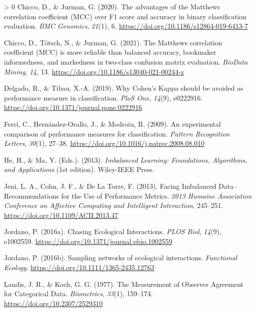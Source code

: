 \documentclass[10pt,oneside]{article}
\newlength{\cslhangindent}
\newenvironment{CSLReferences}[3] %
 {%
  \setlength{\parindent}{0pt}
  \ifodd #1 \everypar{\setlength{\hangindent}{\cslhangindent}}\ignorespaces\fi
  \ifnum #2 > 0
  \setlength{\parskip}{#2\baselineskip}
  \fi
 }%
 {}
\begin{document}
\begin{CSLReferences}{1}{0}
\leavevmode\hypertarget{ref-Chicco2020AdvMat}{}%
Chicco, D., \& Jurman, G. (2020). The advantages of the Matthews
correlation coefficient (MCC) over F1 score and accuracy in binary
classification evaluation. \emph{BMC Genomics}, \emph{21}(1), 6.
\url{https://doi.org/10.1186/s12864-019-6413-7}

\leavevmode\hypertarget{ref-Chicco2021MatCor}{}%
Chicco, D., Tötsch, N., \& Jurman, G. (2021). The Matthews correlation
coefficient (MCC) is more reliable than balanced accuracy, bookmaker
informedness, and markedness in two-class confusion matrix evaluation.
\emph{BioData Mining}, \emph{14}, 13.
\url{https://doi.org/10.1186/s13040-021-00244-z}

\leavevmode\hypertarget{ref-Delgado2019WhyCoh}{}%
Delgado, R., \& Tibau, X.-A. (2019). Why Cohen's Kappa should be avoided
as performance measure in classification. \emph{PloS One}, \emph{14}(9),
e0222916. \url{https://doi.org/10.1371/journal.pone.0222916}

\leavevmode\hypertarget{ref-Ferri2009ExpCom}{}%
Ferri, C., Hernández-Orallo, J., \& Modroiu, R. (2009). An experimental
comparison of performance measures for classification. \emph{Pattern
Recognition Letters}, \emph{30}(1), 27--38.
\url{https://doi.org/10.1016/j.patrec.2008.08.010}

\leavevmode\hypertarget{ref-He2013ImbLea}{}%
He, H., \& Ma, Y. (Eds.). (2013). \emph{Imbalanced Learning:
Foundations, Algorithms, and Applications} (1st edition). Wiley-IEEE
Press.

\leavevmode\hypertarget{ref-Jeni2013FacImb}{}%
Jeni, L. A., Cohn, J. F., \& De La Torre, F. (2013). Facing Imbalanced
Data--Recommendations for the Use of Performance Metrics. \emph{2013
Humaine Association Conference on Affective Computing and Intelligent
Interaction}, 245--251. \url{https://doi.org/10.1109/ACII.2013.47}

\leavevmode\hypertarget{ref-Jordano2016ChaEco}{}%
Jordano, P. (2016a). Chasing Ecological Interactions. \emph{PLOS Biol},
\emph{14}(9), e1002559.
\url{https://doi.org/10.1371/journal.pbio.1002559}

\leavevmode\hypertarget{ref-Jordano2016SamNet}{}%
Jordano, P. (2016b). Sampling networks of ecological interactions.
\emph{Functional Ecology}. \url{https://doi.org/10.1111/1365-2435.12763}

\leavevmode\hypertarget{ref-Landis1977MeaObs}{}%
Landis, J. R., \& Koch, G. G. (1977). The Measurement of Observer
Agreement for Categorical Data. \emph{Biometrics}, \emph{33}(1),
159--174. \url{https://doi.org/10.2307/2529310}


\end{CSLReferences}
\end{document}
